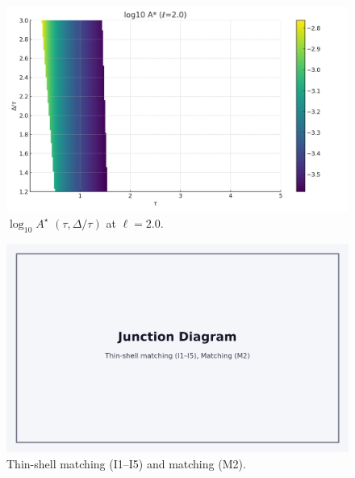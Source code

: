 \documentclass[11pt]{article}
\begin{document}
\begin{figure}[h]\centering\includegraphics[width=0.85\linewidth]{figures/sweeps/Astar_tau_dratio_l2.0.png}\caption{$\log_{10}A^\star$ $(\tau,\Delta/\tau)$ at $\ell=2.0$.}\end{figure}
\begin{figure}[h]\centering\includegraphics[width=0.85\linewidth]{figures/junction_diagram.png}\caption{Thin-shell matching (I1--I5) and matching (M2).}\end{figure}
\end{document}
